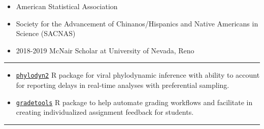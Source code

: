 \documentclass{article}
\begin{document}
	
	
	\begin{description}
		\vspace{-2mm}
		\item[Programs and Professional Membership]\hspace*{.01in}
		
		\begin{itemize}
			\item American Statistical Association
			
			\item Society for the Advancement of Chinanos/Hispanics and Native Americans in Science (SACNAS)
			
			\item 2018-2019 McNair Scholar at University of Nevada, Reno
		\end{itemize}
	\end{description}
	\vspace{-2mm}
	\rule{\linewidth}{1pt}
	

	\begin{description}
		\vspace{-2mm}
		\item[Software Developed]\hspace*{.1in}
		
		\begin{itemize}
			\item \href{https://github.com/CatalinaMedina/phylodyn2}{\texttt{phylodyn2}} R package for viral phylodynamic inference with ability to account for reporting delays in real-time analyses with preferential sampling.
			
			\item \href{https://federicazoe.github.io/gradetools/}{\texttt{gradetools}} R package to help automate grading workflows and facilitate in creating individualized assignment feedback for students.
		\end{itemize}
	\end{description}
	\vspace{-2mm}
	\rule{\linewidth}{1pt}
	
	
\end{document}
